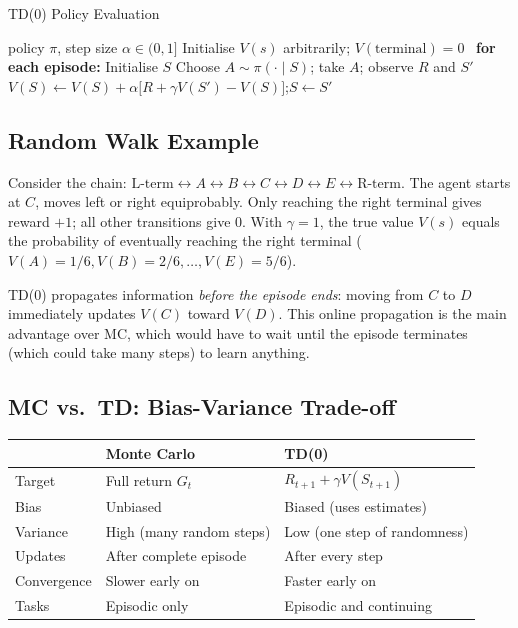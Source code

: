 \documentclass[11pt,a4paper]{article}
\begin{document}
\begin{algobox}[breakable]{TD(0) Policy Evaluation}
\begin{algorithmic}[1]
\Require policy $\pi$, step size $\alpha\in(0,1]$
\State Initialise $V(s)$ arbitrarily; $V(\text{terminal})=0$
\Loop\ \textbf{for each episode:}
  \State Initialise $S$
  \Repeat
    \State Choose $A\sim\pi(\cdot\mid S)$; take $A$; observe $R$ and $S'$
    \State $V(S)\leftarrow V(S)+\alpha\bigl[R+\gamma V(S')-V(S)\bigr]$;\quad $S\leftarrow S'$
\EndLoop
\end{algorithmic}
\end{algobox}

\subsection{Random Walk Example}

Consider the chain: $\text{L-term} \leftrightarrow A \leftrightarrow B \leftrightarrow C \leftrightarrow D \leftrightarrow E \leftrightarrow \text{R-term}$. The agent starts at $C$, moves left or right equiprobably. Only reaching the right terminal gives reward $+1$; all other transitions give $0$. With $\gamma=1$, the true value $V(s)$ equals the probability of eventually reaching the right terminal ($V(A)=1/6, V(B)=2/6, \ldots, V(E)=5/6$).

TD(0) propagates information \emph{before the episode ends}: moving from $C$ to $D$ immediately updates $V(C)$ toward $V(D)$. This online propagation is the main advantage over MC, which would have to wait until the episode terminates (which could take many steps) to learn anything.

\subsection{MC vs.\ TD: Bias-Variance Trade-off}

\begin{tcolorbox}[colback=LightBlue,colframe=AccentBlue,boxrule=0.8pt,arc=3pt]
\begin{tabular}{@{}lll@{}}
\toprule
 & \textbf{Monte Carlo} & \textbf{TD(0)} \\
\midrule
Target & Full return $G_t$ & $R_{t+1}+\gamma V(S_{t+1})$ \\
Bias & Unbiased & Biased (uses estimates) \\
Variance & High (many random steps) & Low (one step of randomness) \\
Updates & After complete episode & After every step \\
Convergence & Slower early on & Faster early on \\
Tasks & Episodic only & Episodic and continuing \\
\bottomrule
\end{tabular}
\end{tcolorbox}
\end{document}
